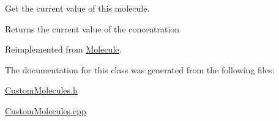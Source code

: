 Get the current value of this molecule.

\begin{DoxyReturn}{Returns}
the current value of the concentration 
\end{DoxyReturn}


Reimplemented from \hyperlink{classMolecule_a554ea822918374775d5f52b5d49d8195}{Molecule}.

The documentation for this class was generated from the following files:\begin{DoxyCompactItemize}
\item 
\hyperlink{CustomMolecules_8h}{CustomMolecules.h}\item 
\hyperlink{CustomMolecules_8cpp}{CustomMolecules.cpp}\end{DoxyCompactItemize}
